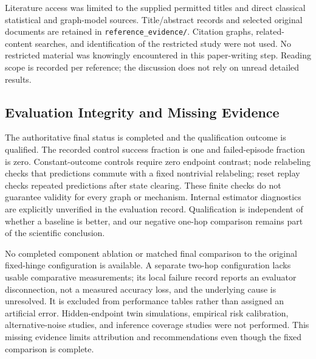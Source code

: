 \documentclass{article}
\begin{document}
Literature access was limited to the supplied permitted titles and direct classical statistical and graph-model sources. Title/abstract records and selected original documents are retained in \texttt{reference\_evidence/}. Citation graphs, related-content searches, and identification of the restricted study were not used. No restricted material was knowingly encountered in this paper-writing step. Reading scope is recorded per reference; the discussion does not rely on unread detailed results.

\subsection{Evaluation Integrity and Missing Evidence}
The authoritative final status is completed and the qualification outcome is qualified. The recorded control success fraction is one and failed-episode fraction is zero. Constant-outcome controls require zero endpoint contrast; node relabeling checks that predictions commute with a fixed nontrivial relabeling; reset replay checks repeated predictions after state clearing. These finite checks do not guarantee validity for every graph or mechanism. Internal estimator diagnostics are explicitly unverified in the evaluation record. Qualification is independent of whether a baseline is better, and our negative one-hop comparison remains part of the scientific conclusion.

No completed component ablation or matched final comparison to the original fixed-hinge configuration is available. A separate two-hop configuration lacks usable comparative measurements; its local failure record reports an evaluator disconnection, not a measured accuracy loss, and the underlying cause is unresolved. It is excluded from performance tables rather than assigned an artificial error. Hidden-endpoint twin simulations, empirical risk calibration, alternative-noise studies, and inference coverage studies were not performed. This missing evidence limits attribution and recommendations even though the fixed comparison is complete.
\end{document}
